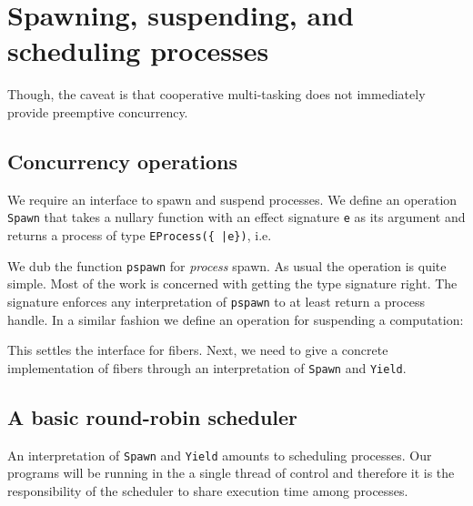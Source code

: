 \documentclass[12pt,mscres,cdtppar,twoside,openright,logo,rightchapter,normalheadings]{infthesis}
\newcommand{\snippet}[1]{}
\theoremstyle{definition}
\newcommand{\todo}[1]{{\par\noindent\small\color{red} \framebox{\parbox{\dimexpr\linewidth-2\fboxsep-2\fboxrule}{\textbf{TODO:} #1}}}}
\begin{document}
\section{Spawning, suspending, and scheduling processes}
\label{sec:links-model-handlers-scheduler}

\todo{Introduce fibers}
Though, the caveat is that cooperative multi-tasking does not
immediately provide preemptive concurrency. 

\subsection{Concurrency operations}

We require an interface to spawn and suspend processes. We define an
operation \lstinline$Spawn$ that takes a nullary function with an
effect signature \lstinline$e$ as its argument and returns a process
of type \lstinline$EProcess({ |e})$, i.e.
%
\snippet{pspawn.links}
%
We dub the function \lstinline$pspawn$ for \emph{process} spawn. As
usual the operation is quite simple. Most of the work is concerned
with getting the type signature right. The signature enforces any
interpretation of \lstinline$pspawn$ to at least return a process
handle. In a similar fashion we define an operation for suspending a
computation:
%
\snippet{yield.links}
%
This settles the interface for fibers. Next, we need to give a
concrete implementation of fibers through an interpretation of
\lstinline$Spawn$ and \lstinline$Yield$.

\subsection{A basic round-robin scheduler}

An interpretation of \lstinline$Spawn$ and \lstinline$Yield$ amounts
to scheduling processes. Our programs will be running in the a single
thread of control and therefore it is the responsibility of the
scheduler to share execution time among processes.
\end{document}
